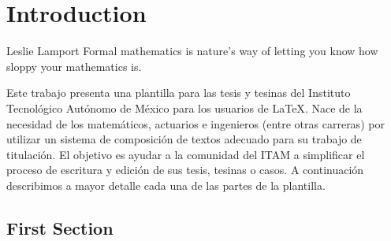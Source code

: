 \chapter{Introduction}
\label{ch:intro}

\begin{chapterquote}{Leslie Lamport}
	Formal mathematics is nature's way of letting you know how sloppy
your mathematics is.
\end{chapterquote}

Este trabajo presenta una plantilla para las tesis y tesinas del Instituto Tecnológico Autónomo de México para los usuarios de \LaTeX \cite{lamport1994latex}. Nace de la necesidad de los matemáticos, actuarios e ingenieros (entre otras carreras) por utilizar un sistema de composición de textos adecuado para su trabajo de titulación. El objetivo es ayudar a la comunidad del ITAM a simplificar el proceso de escritura y edición de sus tesis, tesinas o casos. A continuación describimos a mayor detalle cada una de las partes de la plantilla.


\section{First Section}